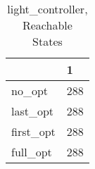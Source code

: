 \begin{table}
\caption{light\_controller, Reachable States}
\label{light_controller_reach}
\begin{tabular}{ll}
\toprule
 & 1 \\
\midrule
no\_opt & 288 \\
last\_opt & 288 \\
first\_opt & 288 \\
full\_opt & 288 \\
\bottomrule
\end{tabular}
\end{table}

